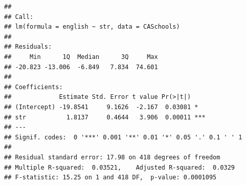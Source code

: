 \documentclass[
]{book}
\begin{document}
\begin{verbatim}
## 
## Call:
## lm(formula = english ~ str, data = CASchools)
## 
## Residuals:
##     Min      1Q  Median      3Q     Max 
## -20.823 -13.006  -6.849   7.834  74.601 
## 
## Coefficients:
##             Estimate Std. Error t value Pr(>|t|)    
## (Intercept) -19.8541     9.1626  -2.167  0.03081 *  
## str           1.8137     0.4644   3.906  0.00011 ***
## ---
## Signif. codes:  0 '***' 0.001 '**' 0.01 '*' 0.05 '.' 0.1 ' ' 1
## 
## Residual standard error: 17.98 on 418 degrees of freedom
## Multiple R-squared:  0.03521,    Adjusted R-squared:  0.0329 
## F-statistic: 15.25 on 1 and 418 DF,  p-value: 0.0001095
\end{verbatim}

\backmatter
  
\end{document}
